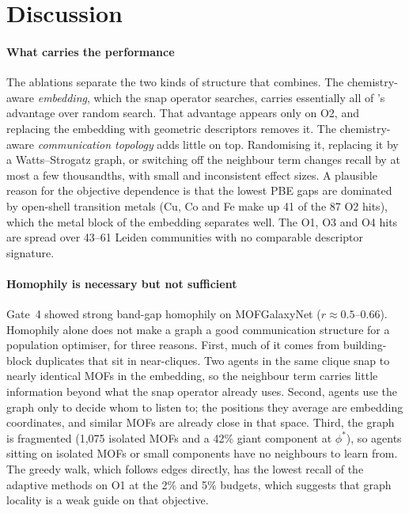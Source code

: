 \section{Discussion}
\label{sec:discussion}

\paragraph{What carries the performance}
The ablations separate the two kinds of structure that \gs{} combines. The chemistry-aware \emph{embedding}, which the snap operator searches, carries essentially all of \gs{}'s advantage over random search. That advantage appears only on O2, and replacing the embedding with geometric descriptors removes it. The chemistry-aware \emph{communication topology} adds little on top. Randomising it, replacing it by a Watts--Strogatz graph, or switching off the neighbour term changes recall by at most a few thousandths, with small and inconsistent effect sizes. A plausible reason for the objective dependence is that the lowest PBE gaps are dominated by open-shell transition metals (Cu, Co and Fe make up 41 of the 87 O2 hits), which the metal block of the embedding separates well. The O1, O3 and O4 hits are spread over 43--61 Leiden communities with no comparable descriptor signature.

\paragraph{Homophily is necessary but not sufficient}
Gate~4 showed strong band-gap homophily on MOFGalaxyNet ($r\approx0.5$--0.66). Homophily alone does not make a graph a good communication structure for a population optimiser, for three reasons. First, much of it comes from building-block duplicates that sit in near-cliques. Two agents in the same clique snap to nearly identical MOFs in the embedding, so the neighbour term carries little information beyond what the snap operator already uses. Second, \gs{} agents use the graph only to decide whom to listen to; the positions they average are embedding coordinates, and similar MOFs are already close in that space. Third, the graph is fragmented (1{,}075 isolated MOFs and a 42\% giant component at $\phi^\ast$), so agents sitting on isolated MOFs or small components have no neighbours to learn from. The greedy walk, which follows edges directly, has the lowest recall of the adaptive methods on O1 at the 2\% and 5\% budgets, which suggests that graph locality is a weak guide on that objective.

